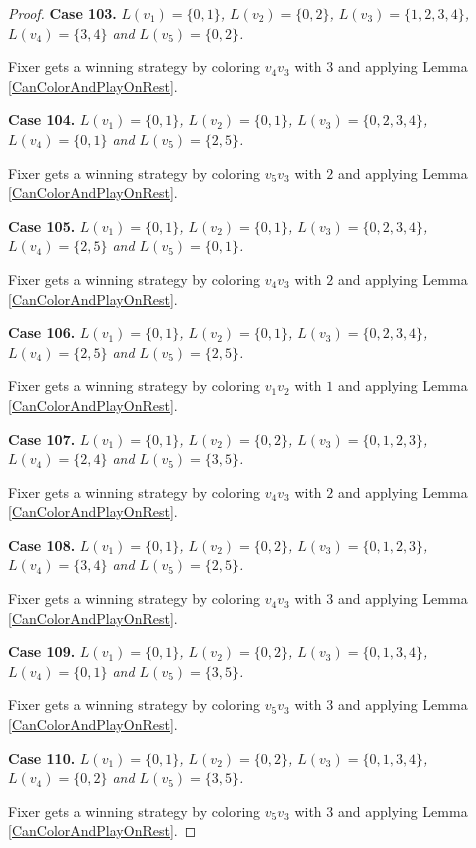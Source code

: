 \documentclass[12pt]{amsart}
\theoremstyle{plain}
\theoremstyle{definition}
\theoremstyle{remark}
\begin{document}
\begin{proof}
\noindent\textbf{Case 103.  }\textit{$L(v_1) = \{0, 1\}$, $L(v_2) = \{0, 2\}$, $L(v_3) = \{1, 2, 3, 4\}$, $L(v_4) = \{3, 4\}$ and $L(v_5) = \{0, 2\}$.}

Fixer gets a winning strategy by coloring $v_4v_3$ with $3$ and applying Lemma \ref{CanColorAndPlayOnRest}.

\noindent\textbf{Case 104.  }\textit{$L(v_1) = \{0, 1\}$, $L(v_2) = \{0, 1\}$, $L(v_3) = \{0, 2, 3, 4\}$, $L(v_4) = \{0, 1\}$ and $L(v_5) = \{2, 5\}$.}

Fixer gets a winning strategy by coloring $v_5v_3$ with $2$ and applying Lemma \ref{CanColorAndPlayOnRest}.

\noindent\textbf{Case 105.  }\textit{$L(v_1) = \{0, 1\}$, $L(v_2) = \{0, 1\}$, $L(v_3) = \{0, 2, 3, 4\}$, $L(v_4) = \{2, 5\}$ and $L(v_5) = \{0, 1\}$.}

Fixer gets a winning strategy by coloring $v_4v_3$ with $2$ and applying Lemma \ref{CanColorAndPlayOnRest}.

\noindent\textbf{Case 106.  }\textit{$L(v_1) = \{0, 1\}$, $L(v_2) = \{0, 1\}$, $L(v_3) = \{0, 2, 3, 4\}$, $L(v_4) = \{2, 5\}$ and $L(v_5) = \{2, 5\}$.}

Fixer gets a winning strategy by coloring $v_1v_2$ with $1$ and applying Lemma \ref{CanColorAndPlayOnRest}.

\noindent\textbf{Case 107.  }\textit{$L(v_1) = \{0, 1\}$, $L(v_2) = \{0, 2\}$, $L(v_3) = \{0, 1, 2, 3\}$, $L(v_4) = \{2, 4\}$ and $L(v_5) = \{3, 5\}$.}

Fixer gets a winning strategy by coloring $v_4v_3$ with $2$ and applying Lemma \ref{CanColorAndPlayOnRest}.

\noindent\textbf{Case 108.  }\textit{$L(v_1) = \{0, 1\}$, $L(v_2) = \{0, 2\}$, $L(v_3) = \{0, 1, 2, 3\}$, $L(v_4) = \{3, 4\}$ and $L(v_5) = \{2, 5\}$.}

Fixer gets a winning strategy by coloring $v_4v_3$ with $3$ and applying Lemma \ref{CanColorAndPlayOnRest}.

\noindent\textbf{Case 109.  }\textit{$L(v_1) = \{0, 1\}$, $L(v_2) = \{0, 2\}$, $L(v_3) = \{0, 1, 3, 4\}$, $L(v_4) = \{0, 1\}$ and $L(v_5) = \{3, 5\}$.}

Fixer gets a winning strategy by coloring $v_5v_3$ with $3$ and applying Lemma \ref{CanColorAndPlayOnRest}.

\noindent\textbf{Case 110.  }\textit{$L(v_1) = \{0, 1\}$, $L(v_2) = \{0, 2\}$, $L(v_3) = \{0, 1, 3, 4\}$, $L(v_4) = \{0, 2\}$ and $L(v_5) = \{3, 5\}$.}

Fixer gets a winning strategy by coloring $v_5v_3$ with $3$ and applying Lemma \ref{CanColorAndPlayOnRest}.


\end{proof}
\end{document}
